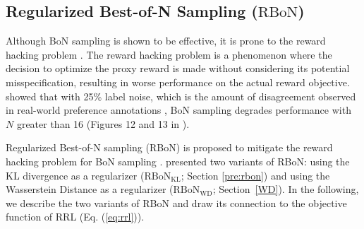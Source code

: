 \subsection{Regularized Best-of-N Sampling ($\mathrm{RBoN}$)}\label{sec:rbon}


Although BoN sampling is shown to be effective, it is prone to the reward hacking problem \citep{amodei2016concrete, ziegler2020finetuning, stiennon2020, NEURIPS2022_3d719fee,pmlr-v202-gao23h}. 
The reward hacking problem is a phenomenon where the decision to optimize the proxy reward is made without considering its potential misspecification, resulting in worse performance on the actual reward objective.
\citet{NEURIPS2023_5fc47800} showed that with 25\% label noise, which is the amount of disagreement observed in real-world preference annotations \citep{stiennon2020,NEURIPS2022_b1efde53}, BoN sampling degrades performance with $N$ greater than 16 (Figures 12 and 13 in \citealt{NEURIPS2023_5fc47800}).

Regularized Best-of-N sampling (RBoN) is proposed to mitigate the reward hacking problem for BoN sampling \citep{jinnai2024regularized}. 
\citet{jinnai2024regularized} presented two variants of RBoN: using the KL divergence as a regularizer ($\mathrm{RBoN}_{\mathrm{KL}}$; Section \ref{pre:rbon}) and using the Wasserstein Distance as a regularizer ($\mathrm{RBoN}_{\mathrm{WD}}$; Section~\ref{WD}).
In the following, we describe the two variants of RBoN and draw its connection to the objective function of RRL (Eq. (\ref{eq:rrl})).

